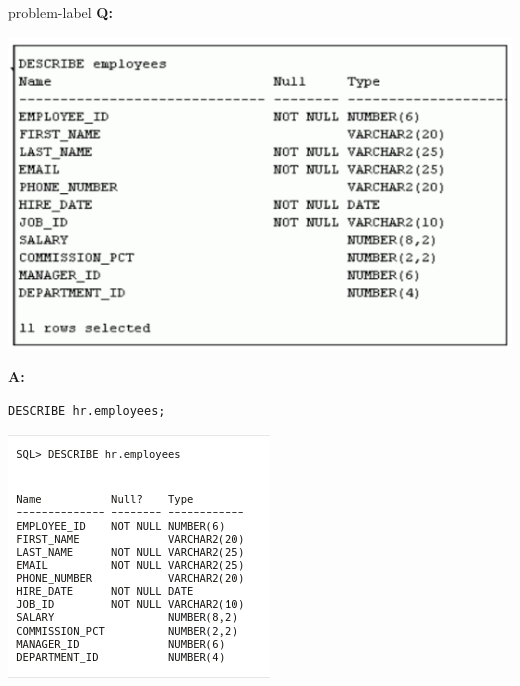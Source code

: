 \begin{problem}{}{problem-label}
    \textbf{Q:} 

\begin{center}
  \includegraphics[scale=0.7]{images/c1q05.png}
\end{center}

    \vspace{1em}
    \textbf{A:}

    \vspace{1em}
    \begin{lstlisting}[language=SQL]
DESCRIBE hr.employees;
\end{lstlisting}
\begin{center}
  \includegraphics[scale=0.75]{images/c1a5.png}
\end{center}
    
\end{problem}

